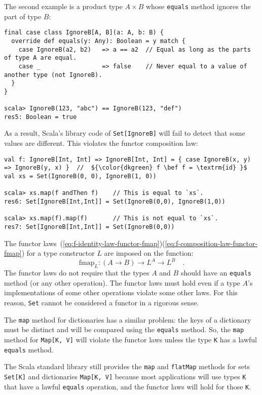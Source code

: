 The second example is a product type $A\times B$ whose \lstinline!equals!
method ignores the part of type $B$:
\begin{lstlisting}
final case class IgnoreB[A, B](a: A, b: B) {
  override def equals(y: Any): Boolean = y match {
    case IgnoreB(a2, b2)   => a == a2  // Equal as long as the parts of type A are equal.
    case _                 => false    // Never equal to a value of another type (not IgnoreB).
  }
}

scala> IgnoreB(123, "abc") == IgnoreB(123, "def")
res5: Boolean = true
\end{lstlisting}
As a result, Scala\textsf{'}s library code of \lstinline!Set[IgnoreB]! will
fail to detect that some values are different. This violates the functor
composition law:
\begin{lstlisting}[mathescape=true]
val f: IgnoreB[Int, Int] => IgnoreB[Int, Int] = { case IgnoreB(x, y) => IgnoreB(y, x) }  //  ${\color{dkgreen} f \bef f = \textrm{id} }$
val xs = Set(IgnoreB(0, 0), IgnoreB(1, 0))

scala> xs.map(f andThen f)    // This is equal to `xs`.
res6: Set[IgnoreB[Int,Int]] = Set(IgnoreB(0,0), IgnoreB(1,0))

scala> xs.map(f).map(f)       // This is not equal to `xs`.
res7: Set[IgnoreB[Int,Int]] = Set(IgnoreB(0,0))
\end{lstlisting}

The functor laws~(\ref{eq:f-identity-law-functor-fmap})\textendash (\ref{eq:f-composition-law-functor-fmap})
for a type constructor $L$ are imposed on the function:
\[
\text{fmap}_{L}:\left(A\rightarrow B\right)\rightarrow L^{A}\rightarrow L^{B}\quad.
\]
The functor laws do not require that the types $A$ and $B$ should
have an \lstinline!equals! method (or any other operation).  The
functor laws must hold even if a type $A$\textsf{'}s implementations of some
other operations violate some other laws. For this reason, \lstinline!Set!
cannot be considered a functor in a rigorous sense.

The \lstinline!map! method for dictionaries has a similar problem:
the keys of a dictionary must be distinct and will be compared using
the \lstinline!equals! method. So, the \lstinline!map! method for
\lstinline!Map[K, V]! will violate the functor laws unless the type
\lstinline!K! has a lawful \lstinline!equals! method.

The Scala standard library still provides the \lstinline!map! and
\lstinline!flatMap! methods for sets \lstinline!Set[K]! and dictionaries
\lstinline!Map[K, V]! because most applications will use types \lstinline!K!
that have a lawful \lstinline!equals! operation, and the functor
laws will hold for those \lstinline!K!.

